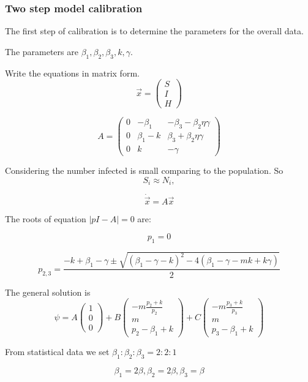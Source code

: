 \documentclass[11pt]{article}
\begin{document}
\subsubsection{Two step model calibration}
The first step of calibration is to determine the parameters for the overall data.

The parameters are $\beta_1,\beta_2,\beta_3, k,\gamma$.

Write the equations in matrix form.
$$\vec{x} =  \begin{pmatrix}
S\\I\\H
 \end{pmatrix}$$ 
 
 $$
 A =  \begin{pmatrix}
0 &-\beta_1 & -\beta_3-\beta_2\eta\gamma \\
0 &\beta_1 -k & \beta_3 + \beta_2 \eta\gamma \\
0 & k & -\gamma 
 \end{pmatrix}
 $$
 
 Considering the number infected is small comparing to the population. So $$S_i \approx N_i, $$
 
 $$\dot{\vec{x}} =  A  \vec{x}$$
 
 The roots of equation $|pI-A| = 0$ are:
 
 $$
 p_1 = 0
 $$
 
 $$
 p_{2,3} = \frac{-k+\beta_1 - \gamma \pm \sqrt{  (\beta_1 - \gamma - k)^2  - 4(\beta_1 - \gamma - mk + k\gamma) } }{2}
 $$
 
 
 The general solution is 
$$\psi = A\begin{pmatrix}
1\\0\\0
 \end{pmatrix}
 +B\begin{pmatrix}
-m\frac{p_2 + k}{p_2}\\ m \\ p_2 - \beta_1 + k
 \end{pmatrix}
 +C\begin{pmatrix}
-m\frac{p_3 + k}{p_3}\\ m \\ p_3- \beta_1 + k
 \end{pmatrix}
$$


From statistical data we set $\beta_1:\beta_2:\beta_3 = 2:2:1$

$$\beta_1 = 2\beta, \beta_2 = 2\beta,\beta_3 = \beta$$
 
 
 
\end{document}
